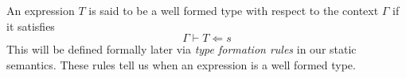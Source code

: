 \documentclass{article}
\begin{document}
\begin{definition} 
  An expression $T$ is said to be a well formed type with respect to the context
  $\Gamma$ if it satisfies
  \[ \Gamma \vdash T \Leftarrow s \]
  This will be defined formally later via \textit{type formation rules} in our
  static semantics.
  These rules tell us when an expression is a well formed type.


\end{definition}



\end{document}
